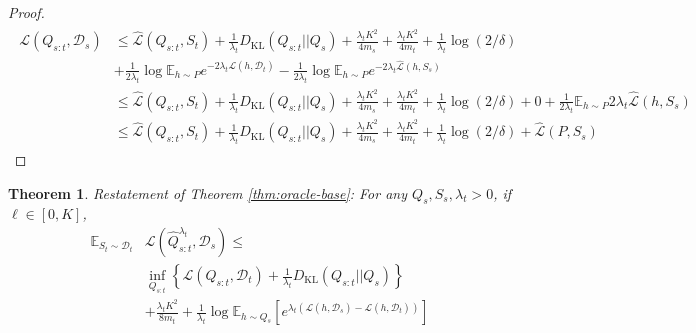 \documentclass{article}
\theoremstyle{plain}
\newtheorem{theorem}{Theorem}[section]
\theoremstyle{definition}
\theoremstyle{remark}
\begin{document}
\begin{proof}
\begin{align*}
\begin{split}
\mathcal{L}(Q_{s:t}, \mathcal{D}_s) &\leq \hat{\mathcal{L}}(Q_{s:t}, S_t)+ \frac{1}{\lambda_t} D_{\mathrm{KL}}(Q_{s:t}||Q_{s})
+\frac{\lambda_t K^2}{4m_s}+\frac{\lambda_t K^2}{4m_t}+\frac{1}{\lambda_t}\log(2/\delta)\\&+\frac{1}{2\lambda_t}\log\mathbb{E}_{h\sim P} e^{-2\lambda_t\mathcal{L}(h,\mathcal{D}_t)}-\frac{1}{2\lambda_t}\log\mathbb{E}_{h\sim P} e^{-2\lambda_t\hat{\mathcal{L}}(h,S_s)}   \\
& \leq \hat{\mathcal{L}}(Q_{s:t}, S_t)+ \frac{1}{\lambda_t} D_{\mathrm{KL}}(Q_{s:t}||Q_{s})
+\frac{\lambda_t K^2}{4m_s}+\frac{\lambda_t K^2}{4m_t}+\frac{1}{\lambda_t}\log(2/\delta)+0+\frac{1}{2\lambda_t}\mathbb{E}_{h\sim P} 2\lambda_t\hat{\mathcal{L}}(h,S_s) \\
& \leq \hat{\mathcal{L}}(Q_{s:t}, S_t) + \frac{1}{\lambda_t} D_{\mathrm{KL}}(Q_{s:t}||Q_{s})
+\frac{\lambda_t K^2}{4m_s}+\frac{\lambda_t K^2}{4m_t}+\frac{1}{\lambda_t}\log(2/\delta)+ \hat{\mathcal{L}}(P, S_s)
\end{split}
\end{align*}

\end{proof}



\begin{theorem} Restatement of Theorem \ref{thm:oracle-base}:
For any $Q_s, S_s, \lambda_t>0$, if $\ell\in [0,K]$, 
\begin{equation} 
\begin{split}
\mathbb{E}_{S_t\sim \mathcal{D}_t}&\mathcal{L}( \hat{Q}^{\lambda_t}_{s:t},\mathcal{D}_s)\leq\\ &\inf_{Q_{s:t}}\left \{ \mathcal{L}(Q_{s:t},\mathcal{D}_t) + \frac{1}{\lambda_t}D_{\mathrm{KL}}(Q_{s:t}||Q_{s}) \right \} \\
&+\frac{\lambda_t K^2}{8m_t}+\frac{1}{\lambda_t}\log\mathbb{E}_{h\sim Q_s}\left [e^{\lambda_t(\mathcal{L}(h,\mathcal{D}_s)-\mathcal{L}(h,\mathcal{D}_t))} \right ]
\end{split}
\end{equation}
\end{theorem}
\end{document}
